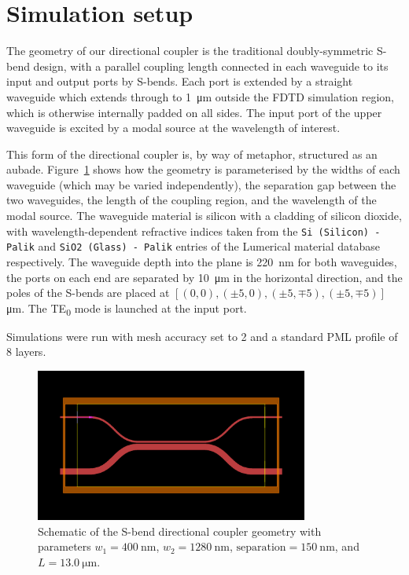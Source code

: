 \documentclass[10pt, a4paper]{article}
\begin{document}
\section{Simulation setup}

The geometry of our directional coupler is the traditional doubly-symmetric S-bend design,
with a parallel coupling length connected in each waveguide to its input and output ports by S-bends.
Each port is extended by a straight waveguide which extends through to \SI{1}{\um} outside the FDTD simulation region,
which is otherwise internally padded on all sides.
The input port of the upper waveguide is excited by a modal source at the wavelength of interest.

This form of the directional coupler is, by way of metaphor, structured as an aubade.
Figure~\ref{fig:s_bend_coupler} shows how the geometry is parameterised by the widths of each waveguide (which may be varied independently),
the separation gap between the two waveguides, the length of the coupling region,
and the wavelength of the modal source.
The waveguide material is silicon with a cladding of silicon dioxide,
with wavelength-dependent refractive indices taken from the \texttt{Si (Silicon) - Palik}
and \texttt{SiO2 (Glass) - Palik} entries of the Lumerical material database respectively.
The waveguide depth into the plane is \SI{220}{\nm} for both waveguides,
the ports on each end are separated by \SI{10}{\um} in the horizontal direction,
and the poles of the S-bends are placed at \([(0,0), (\pm 5, 0), (\pm 5, \mp 5), (\pm 5, \mp 5)]\)\,\unit{\um}.
The TE\textsubscript{0} mode is launched at the input port.

Simulations were run with mesh accuracy set to 2 and a standard PML profile of 8 layers.

\begin{figure}[h!]
  \centering
  \includegraphics[width=0.8\textwidth]{task3/views/wg1_width=0.4_wg2_width=1.28_separation=0.15_coupling_length=13.0.png}
  \caption{Schematic of the S-bend directional coupler geometry
  with parameters \(w_1=\SI{400}{\nm}\), \(w_2=\SI{1280}{\nm}\), \(\text{separation}=\SI{150}{\nm}\), and \(L=\SI{13.0}{\um}\).}
  \label{fig:s_bend_coupler}
\end{figure}
\end{document}
